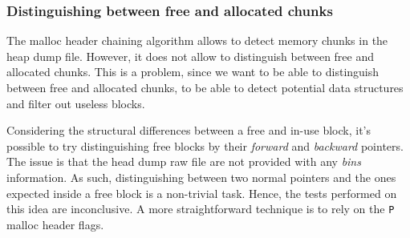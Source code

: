     \subsubsection{Distinguishing between free and allocated chunks}
    The malloc header chaining algorithm allows to detect memory chunks in the heap dump file. However, it does not allow to distinguish between free and allocated chunks. This is a problem, since we want to be able to distinguish between free and allocated chunks, to be able to detect potential data structures and filter out useless blocks.
    
    Considering the structural differences between a free and in-use block, it's possible to try distinguishing free blocks by their \textit{forward} and \textit{backward} pointers. The issue is that the head dump raw file are not provided with any \textit{bins} information. As such, distinguishing between two normal pointers and the ones expected inside a free block is a non-trivial task. Hence, the tests performed on this idea are inconclusive. A more straightforward technique is to rely on the \texttt{P} malloc header flags. 
    
